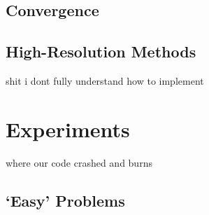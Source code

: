 \documentclass{myproject}
\begin{document}
\subsection{Convergence}



\subsection{High-Resolution Methods}

shit i dont fully understand how to implement

\section{Experiments}

where our code crashed and burns

\subsection{`Easy' Problems}
\end{document}
